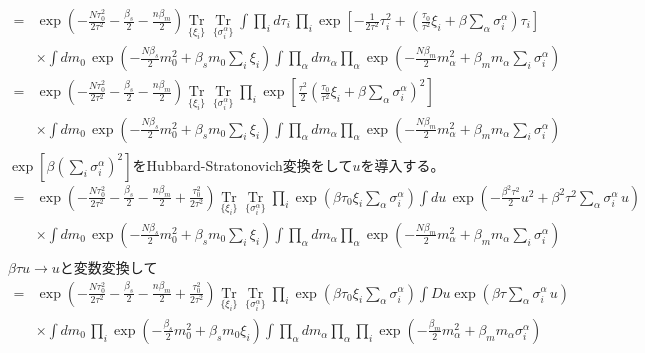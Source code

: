\documentclass{ltjsarticle}
\begin{document}
\begin{align}
    =&\exp(-\frac{N\tau_0^2}{2\tau^2}-\frac{\beta_s}{2}-\frac{n\beta_m}{2})\mathop{\mathrm{Tr}}\limits_{\{\xi_i\}}\mathop{\mathrm{Tr}}\limits_{\{\sigma_i^\alpha\}} \int \prod_i d\tau_i\,\prod_i\exp\left[-\frac{1}{2\tau^2}\tau_i^2+\left(\frac{\tau_0}{\tau^2}\xi_i+\beta\displaystyle\sum_\alpha\sigma_i^\alpha\right)\tau_i\right]\\
    &\times \int dm_0 \,\exp\left(-\frac{N\beta_s}{2}m_0^2+\beta_s m_0\sum_i\xi_i \right)\int \prod_\alpha dm_\alpha \prod_\alpha \exp\left(-\frac{N\beta_m}{2}m_\alpha^2 + \beta_m m_\alpha\sum_i\sigma_i^\alpha\right)\\
    =&\exp(-\frac{N\tau_0^2}{2\tau^2}-\frac{\beta_s}{2}-\frac{n\beta_m}{2})\mathop{\mathrm{Tr}}\limits_{\{\xi_i\}}\mathop{\mathrm{Tr}}\limits_{\{\sigma_i^\alpha\}} \prod_i\exp\left[\frac{\tau^2}{2}\left(\frac{\tau_0}{\tau^2}\xi_i+\beta\displaystyle\sum_\alpha\sigma_i^\alpha\right)^2\right]\\
    &\times \int dm_0 \,\exp\left(-\frac{N\beta_s}{2}m_0^2+\beta_s m_0\sum_i\xi_i \right)\int \prod_\alpha dm_\alpha \prod_\alpha\exp\left(-\frac{N\beta_m}{2}m_\alpha^2 + \beta_m m_\alpha\sum_i\sigma_i^\alpha\right)\\
\end{align}
$\exp \left[\beta\left(\displaystyle\sum_{i}\sigma_i^\alpha\right)^2\right] $をHubbard-Stratonovich変換をして$u$を導入する。
\begin{align}
    =&\exp(-\frac{N\tau_0^2}{2\tau^2}-\frac{\beta_s}{2}-\frac{n\beta_m}{2} +\frac{\tau_0^2}{2\tau^2})\mathop{\mathrm{Tr}}\limits_{\{\xi_i\}}\mathop{\mathrm{Tr}}\limits_{\{\sigma_i^\alpha\}} \prod_i\exp\left( \beta\tau_0 \xi_i \displaystyle\sum_\alpha\sigma_i^\alpha\right)\int du \,\exp\left(-\frac{\beta^2 \tau^2}{2}u^2+\beta^2\tau^2 \displaystyle\sum_\alpha\sigma_i^\alpha \, u\right)\\
    &\times \int dm_0 \,\exp\left(-\frac{N\beta_s}{2}m_0^2+\beta_s m_0\sum_i\xi_i \right)\int \prod_\alpha dm_\alpha\prod_\alpha \exp\left(-\frac{N\beta_m}{2}m_\alpha^2 + \beta_m m_\alpha\sum_i\sigma_i^\alpha\right)\\
\end{align}
$\beta\tau u \to u$と変数変換して
\begin{align}
     =&\exp(-\frac{N\tau_0^2}{2\tau^2}-\frac{\beta_s}{2}-\frac{n\beta_m}{2} +\frac{\tau_0^2}{2\tau^2})\mathop{\mathrm{Tr}}\limits_{\{\xi_i\}}\mathop{\mathrm{Tr}}\limits_{\{\sigma_i^\alpha\}} \prod_i\exp\left( \beta\tau_0 \xi_i \displaystyle\sum_\alpha\sigma_i^\alpha\right)\int Du \exp\left(\beta\tau \displaystyle\sum_\alpha\sigma_i^\alpha \, u\right)\\
    &\times \int dm_0 \,\prod_i\exp\left(-\frac{\beta_s}{2}m_0^2+\beta_s m_0\xi_i \right)\int \prod_\alpha dm_\alpha \prod_\alpha \prod_i \exp\left(-\frac{\beta_m}{2}m_\alpha^2 + \beta_m m_\alpha\sigma_i^\alpha\right)\\
\end{align}
\end{document}

